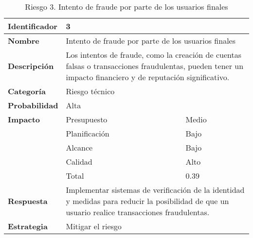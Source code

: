\begin{table}[H]
    \centering
    \caption{Riesgo 3. Intento de fraude por parte de los usuarios finales}
    \label{table:risk_fraude}
    \begin{tabular}{>{\columncolor{lightgreen!20}}l l l}
    \toprule
    \rowcolor{lightgreen}
    \textbf{Identificador} & \multicolumn{2}{l}{3} \\
    \midrule
    \textbf{Nombre} & \multicolumn{2}{l}{Intento de fraude por parte de los usuarios finales} \\
    \midrule
    \textbf{Descripción} & \multicolumn{2}{p{10cm}}{Los intentos de fraude, como la creación de cuentas falsas o transacciones fraudulentas, pueden tener un impacto financiero y de reputación significativo.} \\
    \midrule
    \textbf{Categoría} & \multicolumn{2}{l}{Riesgo técnico} \\
    \midrule
    \textbf{Probabilidad} & \multicolumn{2}{l}{Alta} \\
    \midrule
    \textbf{Impacto} & Presupuesto & Medio \\
    \cmidrule(lr){2-3}
    & Planificación & Bajo \\
    \cmidrule(lr){2-3}
    & Alcance & Bajo \\
    \cmidrule(lr){2-3}
    & Calidad & Alto \\
    \cmidrule(lr){2-3}
    & Total & 0.39 \\
    \midrule
    \textbf{Respuesta} & \multicolumn{2}{p{10cm}}{Implementar sistemas de verificación de la identidad y medidas para reducir la posibilidad de que un usuario realice transacciones fraudulentas.} \\
    \midrule
    \textbf{Estrategia} & \multicolumn{2}{l}{Mitigar el riesgo} \\
    \bottomrule
    \end{tabular}
\end{table}


